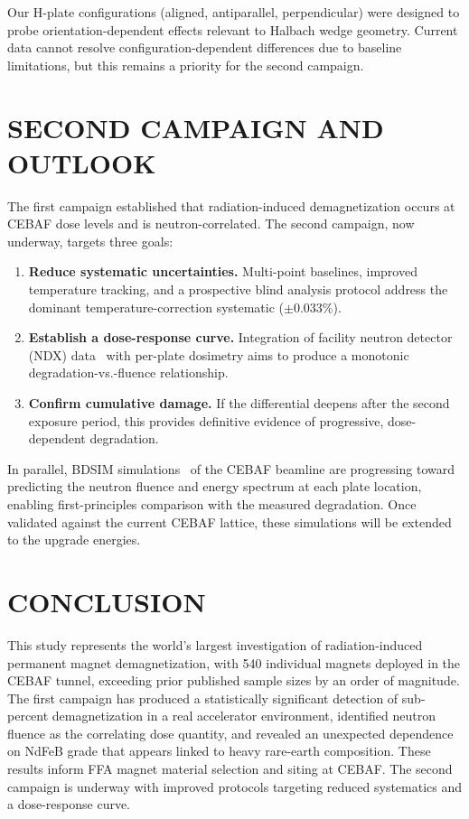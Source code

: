 \documentclass[a4paper,
               ]{jacow}
\begin{document}
Our H-plate configurations (aligned, antiparallel, perpendicular) were designed to probe orientation-dependent effects relevant to Halbach wedge geometry. Current data cannot resolve configuration-dependent differences due to baseline limitations, but this remains a priority for the second campaign.

\section{SECOND CAMPAIGN AND OUTLOOK}

The first campaign established that radiation-induced demagnetization occurs at CEBAF dose levels and is neutron-correlated. The second campaign, now underway, targets three goals:

\begin{enumerate}
\item \textbf{Reduce systematic uncertainties.} Multi-point baselines, improved temperature tracking, and a prospective blind analysis protocol address the dominant temperature-correction systematic (${\pm}0.033\%$).
\item \textbf{Establish a dose-response curve.} Integration of facility neutron detector (NDX) data~\cite{NDX} with per-plate dosimetry aims to produce a monotonic degradation-vs.-fluence relationship.
\item \textbf{Confirm cumulative damage.} If the differential deepens after the second exposure period, this provides definitive evidence of progressive, dose-dependent degradation.
\end{enumerate}

In parallel, BDSIM simulations~\cite{NEVAY:BDSIM, Gamage:IPAC24-THPS57} of the CEBAF beamline are progressing toward predicting the neutron fluence and energy spectrum at each plate location, enabling first-principles comparison with the measured degradation. Once validated against the current CEBAF lattice, these simulations will be extended to the upgrade energies.

\section{CONCLUSION}

This study represents the world's largest investigation of radiation-induced permanent magnet demagnetization, with 540 individual magnets deployed in the CEBAF tunnel, exceeding prior published sample sizes by an order of magnitude. The first campaign has produced a statistically significant detection of sub-percent demagnetization in a real accelerator environment, identified neutron fluence as the correlating dose quantity, and revealed an unexpected dependence on NdFeB grade that appears linked to heavy rare-earth composition. These results inform FFA magnet material selection and siting at CEBAF. The second campaign is underway with improved protocols targeting reduced systematics and a dose-response curve.
\end{document}
